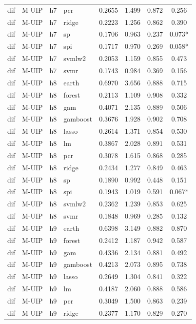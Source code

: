 \begin{ThreePartTable}
\begin{longtable}[t]{llclcccc}
dif & M-UIP & h7 & pcr & 0.2655 & 1.499 & 0.872 & 0.256\\
dif & M-UIP & h7 & ridge & 0.2223 & 1.256 & 0.862 & 0.390\\
dif & M-UIP & h7 & sp & 0.1706 & 0.963 & 0.237 & 0.073*\\
dif & M-UIP & h7 & spi & 0.1717 & 0.970 & 0.269 & 0.058*\\
dif & M-UIP & h7 & svmlw2 & 0.2053 & 1.159 & 0.855 & 0.473\\
dif & M-UIP & h7 & svmr & 0.1743 & 0.984 & 0.369 & 0.156\\
\addlinespace
dif & M-UIP & h8 & earth & 0.6970 & 3.656 & 0.888 & 0.715\\
dif & M-UIP & h8 & forest & 0.2113 & 1.109 & 0.908 & 0.332\\
dif & M-UIP & h8 & gam & 0.4071 & 2.135 & 0.889 & 0.506\\
dif & M-UIP & h8 & gamboost & 0.3676 & 1.928 & 0.902 & 0.708\\
dif & M-UIP & h8 & lasso & 0.2614 & 1.371 & 0.854 & 0.530\\
dif & M-UIP & h8 & lm & 0.3867 & 2.028 & 0.891 & 0.531\\
dif & M-UIP & h8 & pcr & 0.3078 & 1.615 & 0.868 & 0.285\\
dif & M-UIP & h8 & ridge & 0.2434 & 1.277 & 0.849 & 0.463\\
dif & M-UIP & h8 & sp & 0.1890 & 0.992 & 0.448 & 0.151\\
dif & M-UIP & h8 & spi & 0.1943 & 1.019 & 0.591 & 0.067*\\
dif & M-UIP & h8 & svmlw2 & 0.2362 & 1.239 & 0.853 & 0.625\\
dif & M-UIP & h8 & svmr & 0.1848 & 0.969 & 0.285 & 0.132\\
\addlinespace
dif & M-UIP & h9 & earth & 0.6398 & 3.149 & 0.882 & 0.870\\
dif & M-UIP & h9 & forest & 0.2412 & 1.187 & 0.942 & 0.587\\
dif & M-UIP & h9 & gam & 0.4336 & 2.134 & 0.881 & 0.492\\
dif & M-UIP & h9 & gamboost & 0.4213 & 2.073 & 0.895 & 0.738\\
dif & M-UIP & h9 & lasso & 0.2649 & 1.304 & 0.841 & 0.322\\
dif & M-UIP & h9 & lm & 0.4187 & 2.060 & 0.888 & 0.586\\
dif & M-UIP & h9 & pcr & 0.3049 & 1.500 & 0.863 & 0.239\\
dif & M-UIP & h9 & ridge & 0.2377 & 1.170 & 0.829 & 0.270\\

\end{longtable}
\end{ThreePartTable}
